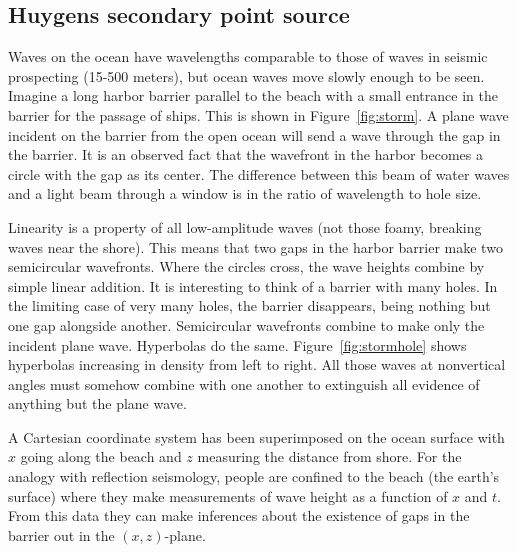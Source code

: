\subsection{Huygens secondary point source}
\par
Waves on the ocean have wavelengths comparable
to those of waves in seismic prospecting (15-500 meters),
but ocean waves move slowly enough to be seen.
Imagine a long harbor barrier parallel to the beach
with a small entrance in the barrier for the passage of ships.
This is shown in Figure~\ref{fig:storm}. %
A plane wave incident on the barrier from the open ocean
will send a wave through the gap in the barrier.
It is an observed fact that the wavefront in the harbor
becomes a circle with the gap as its center.
The difference between this beam of water waves
and a light beam through a window
is in the ratio of wavelength to hole size.
\par
Linearity is a property of all low-amplitude waves
(not those foamy, breaking waves near the shore).
This means that two gaps in the harbor barrier
make two semicircular wavefronts.
Where the circles cross, the wave heights combine by simple linear addition.
It is interesting to think of a barrier with many holes.
In the limiting case of very many holes, the barrier disappears,
being nothing but one gap alongside another.
Semicircular wavefronts combine to make only the incident plane wave.
Hyperbolas do the same.
Figure~\ref{fig:stormhole} shows hyperbolas
increasing in density from left to right. %
All those waves at nonvertical angles must somehow combine
with one another to extinguish all evidence of anything but the plane wave.
\par
{}
A Cartesian coordinate system has been superimposed
on the ocean surface with  $x$  going along the beach
and  $z$  measuring the distance from shore.
For the analogy with reflection seismology,
people are confined to the
beach (the earth's surface) where they make
measurements of wave height as a function of  $x$  and  $t$.
From this data they can make inferences about
the existence of gaps in the barrier out in the $(x , z)$-plane.  
